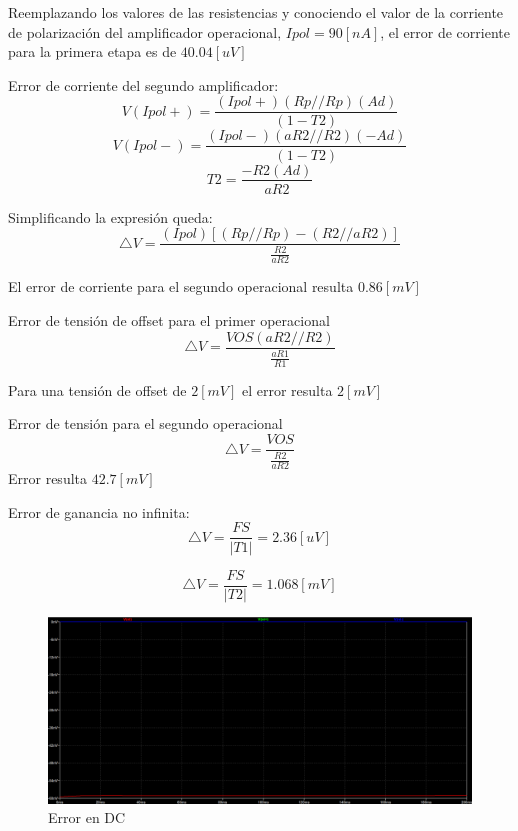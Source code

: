 \documentclass[12pt]{article}
\begin{document}
	Reemplazando los valores de las resistencias y conociendo el valor de la corriente de polarización del amplificador operacional, $Ipol=90[nA]$, el error de corriente para la primera etapa es de $40.04[uV]$
	
	Error de corriente del segundo amplificador:
	\begin{equation}
		V(Ipol+)=\frac{(Ipol+)(Rp//Rp)(Ad)}{(1-T2)}
	\end{equation}
	\begin{equation}
		V(Ipol-)=\frac{(Ipol-)(aR2//R2)(-Ad)}{(1-T2)}
	\end{equation}
	\begin{equation}
		T2=\frac{-R2(Ad)}{aR2}
	\end{equation}
	
	Simplificando la expresión queda:
	\begin{equation}
		\bigtriangleup V= \frac{(Ipol)[(Rp//Rp)-(R2//aR2)]}{\frac{R2}{aR2}}
	\end{equation}
	
	El error de corriente para el segundo operacional resulta $0.86[mV]$
	
	Error de tensión de offset para el primer operacional
	\begin{equation}
		\bigtriangleup V = \frac{VOS(aR2//R2)}{\frac{aR1}{R1}}
	\end{equation}
	
	Para una tensión de offset de  $2[mV]$  el error resulta $2[mV]$
	
	Error de tensión para el segundo operacional
	\begin{equation}
		\bigtriangleup V=\frac{VOS}{\frac{R2}{aR2}}
	\end{equation}
	Error resulta $42.7[mV]$
	
	Error de ganancia no infinita:
	\begin{equation}
		\bigtriangleup V = \frac{FS}{|T1|}=2.36[uV]
	\end{equation}
	
		\begin{equation}
		\bigtriangleup V = \frac{FS}{|T2|}=1.068[mV]
	\end{equation}
	
	\begin{figure}
		\includegraphics[width=\linewidth]{Imagenes_simulaciones/Sim_Error_DC_C2}
		\caption[Error en DC]{Error en DC}
		\label{fig:simerrordcc2}
	\end{figure}
	
\end{document}
